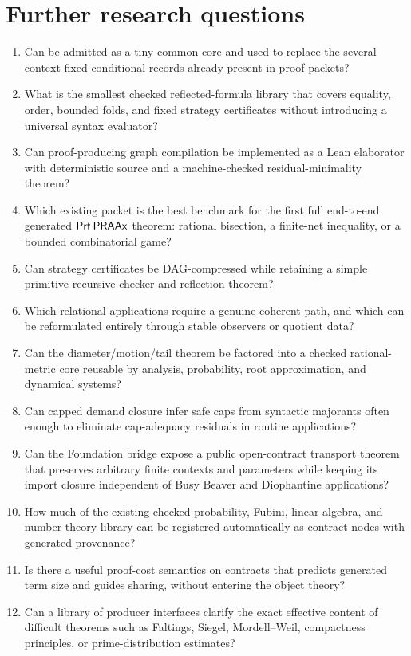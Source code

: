 \section{Further research questions}\label{sec:research}

\begin{enumerate}
  \item Can  be admitted as a tiny common core and used to replace the several context-fixed conditional records already present in proof packets?
  \item What is the smallest checked reflected-formula library that covers equality, order, bounded folds, and fixed strategy certificates without introducing a universal syntax evaluator?
  \item Can proof-producing graph compilation be implemented as a Lean elaborator with deterministic source and a machine-checked residual-minimality theorem?
  \item Which existing packet is the best benchmark for the first full end-to-end generated \(\mathsf{Prf}\,\mathsf{PRAAx}\) theorem: rational bisection, a finite-net inequality, or a bounded combinatorial game?
  \item Can strategy certificates be DAG-compressed while retaining a simple primitive-recursive checker and reflection theorem?
  \item Which relational applications require a genuine coherent path, and which can be reformulated entirely through stable observers or quotient data?
  \item Can the diameter/motion/tail theorem be factored into a checked rational-metric core reusable by analysis, probability, root approximation, and dynamical systems?
  \item Can capped demand closure infer safe caps from syntactic majorants often enough to eliminate cap-adequacy residuals in routine applications?
  \item Can the Foundation bridge expose a public open-contract transport theorem that preserves arbitrary finite contexts and parameters while keeping its import closure independent of Busy Beaver and Diophantine applications?
  \item How much of the existing checked probability, Fubini, linear-algebra, and number-theory library can be registered automatically as contract nodes with generated provenance?
  \item Is there a useful proof-cost semantics on contracts that predicts generated term size and guides sharing, without entering the object theory?
  \item Can a library of producer interfaces clarify the exact effective content of difficult theorems such as Faltings, Siegel, Mordell--Weil, compactness principles, or prime-distribution estimates?
\end{enumerate}
